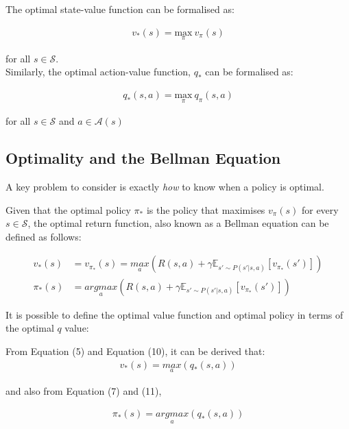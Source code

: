 \documentclass{article}
\begin{document}
The optimal state-value function can be formalised as: 

\begin{align}
    v_*(s) = \underset{\pi}{\text{max}}\ v_\pi(s)
\end{align}

for all $s \in \mathcal{S}$. \\


Similarly, the optimal action-value function, $q_*$ can be formalised as: 

\begin{align}
        q_*(s, a) = \underset{\pi}{\text{max}}\ q_\pi(s, a)
\end{align}

for all $s \in \mathcal{S}$ and $a \in \mathcal{A}(s)$


\subsection{Optimality and the Bellman Equation}

A key problem to consider is exactly \textit{how} to know when a policy is optimal.

Given that the optimal policy $\pi_*$ is the policy that maximises $v_\pi(s)$ for every $s \in \mathcal{S}$, the optimal return function, also known as a Bellman equation can be defined as follows\cite{Sutton1998}:

\begin{align}
    v_*(s) &= v_{\pi_*}(s) = \underset{a}{max}(R(s, a) + \gamma \mathbb{E}_{s' \sim P(s'|s, a)} \left[ v_{\pi_*}(s')\right]) \\
    \pi_*(s) &= \underset{a}{argmax}(R(s, a) + \gamma \mathbb{E}_{s' \sim P(s'|s, a)} \left[ v_{\pi_*}(s')\right]) 
\end{align}



It is possible to define the optimal value function and optimal policy in terms of the optimal $q$ value:

From Equation (5) and Equation (10), it can be derived that:
\begin{align}
    v_* (s) = \underset{a}{max} (q_*(s, a))
\end{align}


and also from Equation (7) and (11),

\begin{align}
    \pi_*(s) = \underset{a}{argmax}(q_*(s,a))
\end{align}
\end{document}
